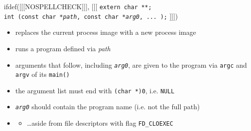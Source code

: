 \begin{slide}
ifdef([[[NOSPELLCHECK]]], [[[
\texttt{extern char **;\\
int (const char *\emph{path}, const char *\emph{arg0}, ... );}
]]])
\begin{itemize}
\item replaces the current process image with a new process image
\item runs a program defined via \emph{path}
\item arguments that follow, including \emph{\texttt{arg0}}, are given to the
program via \texttt{argc} and \texttt{argv} of its \texttt{main()}
\item the argument list must end with \texttt{(char *)0}, i.e. \texttt{NULL}
\item \emph{\texttt{arg0}} should contain the program name (i.e. not the full
path)
\item {}
\begin{itemize}
\item \dots{}aside from file descriptors with flag \texttt{FD\_CLOEXEC}
\end{itemize}
\end{itemize}
\end{slide}

\label{EXEC}

